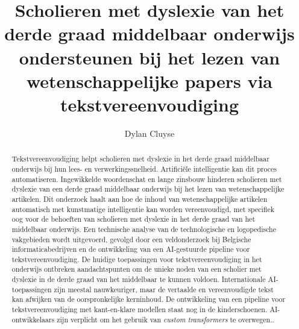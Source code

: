 \documentclass{hogent-article}
\title{Scholieren met dyslexie van het derde graad middelbaar onderwijs ondersteunen bij het lezen van wetenschappelijke papers via tekstvereenvoudiging}
\author{Dylan Cluyse}
\begin{document}
\begin{abstract}
Tekstvereenvoudiging helpt scholieren met dyslexie in het derde graad middelbaar onderwijs bij hun lees- en verwerkingssnelheid. Artificiële intelligentie kan dit proces automatiseren. Ingewikkelde woordenschat en lange zinsbouw hinderen scholieren met dyslexie van een derde graad middelbaar onderwijs bij het lezen van wetenschappelijke artikelen. Dit onderzoek haalt aan hoe de inhoud van wetenschappelijke artikelen automatisch  met kunstmatige intelligentie kan worden vereenvoudigd, met specifiek oog voor de behoeften van scholieren met dyslexie in het derde graad van het middelbaar onderwijs. Een technische analyse van de technologische en logopedische vakgebieden wordt uitgevoerd, gevolgd door een veldonderzoek bij Belgische informaticabedrijven en de ontwikkeling van een AI-gestuurde pipeline voor tekstvereenvoudiging. De huidige toepassingen voor tekstvereenvoudiging in het onderwijs ontbreken aandachtspunten om de unieke noden van een scholier met dyslexie in de derde graad van het middelbaar te kunnen voldoen. Internationale AI-toepassingen zijn meestal nauwkeuriger, maar de vertaalde en vereenvoudigde tekst kan afwijken van de oorspronkelijke kerninhoud. De ontwikkeling van een pipeline voor tekstvereenvoudiging met kant-en-klare modellen staat nog in de kinderschoenen. AI-ontwikkelaars zijn verplicht om het gebruik van \textit{custom transformers} te overwegen..
\end{abstract}

\tableofcontents



\printbibliography[heading=bibintoc]
\end{document}
